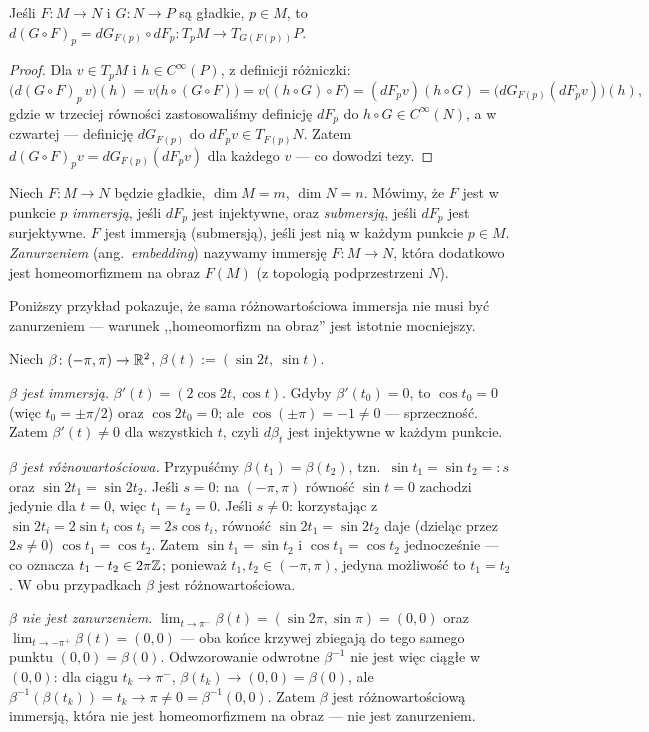 \begin{twierdzenie}
Jeśli $F\colon M\to N$ i $G\colon N\to P$ są gładkie, $p\in M$, to
$d(G\circ F)_p=dG_{F(p)}\circ dF_p\colon T_pM\to T_{G(F(p))}P$.
\end{twierdzenie}
\begin{proof}
Dla $v\in T_pM$ i $h\in C^\infty(P)$, z definicji różniczki:
\[
\big(d(G\circ F)_p\,v\big)(h)=v\big(h\circ(G\circ F)\big)=v\big((h\circ G)\circ F\big)=
(dF_pv)(h\circ G)=\big(dG_{F(p)}(dF_pv)\big)(h),
\]
gdzie w trzeciej równości zastosowaliśmy definicję $dF_p$ do $h\circ G\in C^\infty(N)$, a
w czwartej — definicję $dG_{F(p)}$ do $dF_pv\in T_{F(p)}N$. Zatem $d(G\circ F)_pv=
dG_{F(p)}(dF_pv)$ dla każdego $v$ — co dowodzi tezy.
\end{proof}


\begin{definicja}
Niech $F\colon M\to N$ będzie gładkie, $\dim M=m$, $\dim N=n$. Mówimy, że $F$ jest w
punkcie $p$ \emph{immersją}, jeśli $dF_p$ jest injektywne, oraz \emph{submersją}, jeśli
$dF_p$ jest surjektywne. $F$ jest immersją (submersją), jeśli jest nią w każdym punkcie
$p\in M$. \emph{Zanurzeniem} (ang.\ \emph{embedding}) nazywamy immersję $F\colon M\to N$,
która dodatkowo jest homeomorfizmem na obraz $F(M)$ (z topologią podprzestrzeni $N$).
\end{definicja}

Poniższy przykład pokazuje, że sama różnowartościowa immersja nie musi być zanurzeniem —
warunek ,,homeomorfizm na obraz'' jest istotnie mocniejszy.

\begin{przyklad}\label{prz:osemka}
Niech $\beta\colon(-\pi,\pi)\to\mathbb{R}^2$, $\beta(t):=(\sin2t,\ \sin t)$.

\emph{$\beta$ jest immersją.} $\beta'(t)=(2\cos2t,\cos t)$. Gdyby $\beta'(t_0)=0$, to
$\cos t_0=0$ (więc $t_0=\pm\pi/2$) oraz $\cos2t_0=0$; ale $\cos(\pm\pi)=-1\neq0$ —
sprzeczność. Zatem $\beta'(t)\neq0$ dla wszystkich $t$, czyli $d\beta_t$ jest injektywne w
każdym punkcie.

\emph{$\beta$ jest różnowartościowa.} Przypuśćmy $\beta(t_1)=\beta(t_2)$, tzn.\ $\sin t_1=
\sin t_2=:s$ oraz $\sin2t_1=\sin2t_2$. Jeśli $s=0$: na $(-\pi,\pi)$ równość $\sin t=0$
zachodzi jedynie dla $t=0$, więc $t_1=t_2=0$. Jeśli $s\neq0$: korzystając z $\sin2t_i=
2\sin t_i\cos t_i=2s\cos t_i$, równość $\sin2t_1=\sin2t_2$ daje (dzieląc przez $2s\neq0$)
$\cos t_1=\cos t_2$. Zatem $\sin t_1=\sin t_2$ i $\cos t_1=\cos t_2$ jednocześnie — co
oznacza $t_1-t_2\in2\pi\mathbb{Z}$; ponieważ $t_1,t_2\in(-\pi,\pi)$, jedyna możliwość to $t_1=t_2$.
W obu przypadkach $\beta$ jest różnowartościowa.

\emph{$\beta$ nie jest zanurzeniem.} $\lim_{t\to\pi^-}\beta(t)=(\sin2\pi,\sin\pi)=(0,0)$
oraz $\lim_{t\to-\pi^+}\beta(t)=(0,0)$ — oba końce krzywej zbiegają do tego samego punktu
$(0,0)=\beta(0)$. Odwzorowanie odwrotne $\beta^{-1}$ nie jest więc ciągłe w $(0,0)$: dla
ciągu $t_k\to\pi^-$, $\beta(t_k)\to(0,0)=\beta(0)$, ale $\beta^{-1}(\beta(t_k))=t_k\to\pi
\neq0=\beta^{-1}(0,0)$. Zatem $\beta$ jest różnowartościową immersją, która nie jest
homeomorfizmem na obraz — nie jest zanurzeniem.
\end{przyklad}

